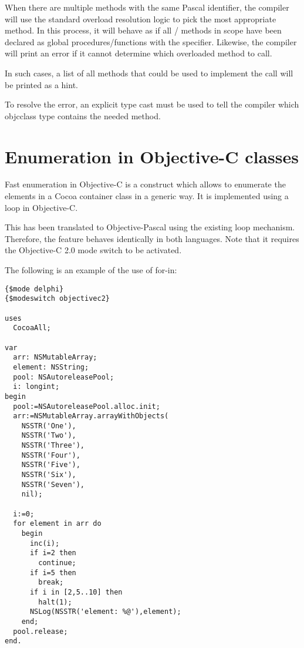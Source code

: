 When there are multiple methods with the same Pascal identifier, the
compiler will use the standard overload resolution logic to pick the most
appropriate method. In this process, it will behave as if all
/ methods in scope have been declared as global
procedures/functions with the  specifier. Likewise, the compiler 
will print an error if it cannot determine which overloaded method to call.

In such cases, a list of all methods that could be used to implement the call
will be printed as a hint.

To resolve the error, an explicit type cast must be used to tell the compiler
which objcclass type contains the needed method.

\section{Enumeration in Objective-C classes}
Fast enumeration in Objective-C is a construct which allows to enumerate
the elements in a Cocoa container class in a generic way. It is implemented
using a  loop in Objective-C.

This has been translated to Objective-Pascal using the existing  
loop mechanism. Therefore, the feature behaves identically in both languages.
Note that it requires the Objective-C 2.0 mode switch to be activated.

The following is an example of the use of for-in:
\begin{verbatim}
{$mode delphi}
{$modeswitch objectivec2}
 
uses
  CocoaAll;
 
var
  arr: NSMutableArray;
  element: NSString;
  pool: NSAutoreleasePool;
  i: longint;
begin
  pool:=NSAutoreleasePool.alloc.init;
  arr:=NSMutableArray.arrayWithObjects(
    NSSTR('One'),
    NSSTR('Two'),
    NSSTR('Three'),
    NSSTR('Four'),
    NSSTR('Five'),
    NSSTR('Six'),
    NSSTR('Seven'),
    nil);
 
  i:=0;
  for element in arr do
    begin
      inc(i);
      if i=2 then
        continue;
      if i=5 then
        break;
      if i in [2,5..10] then
        halt(1);
      NSLog(NSSTR('element: %@'),element);
    end;
  pool.release;
end.
\end{verbatim}


